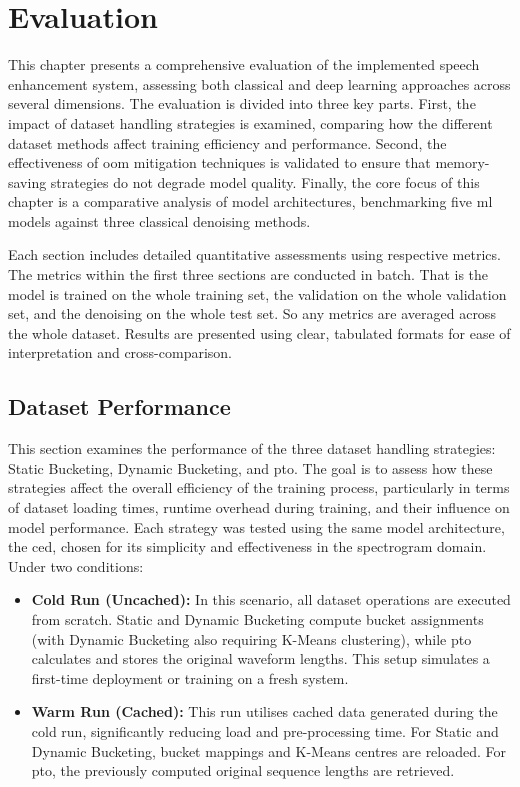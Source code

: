 \graphicspath{{content/chapters/7_evaluation/figures/}}
\chapter{Evaluation}
\label{chp:evaluation}

This chapter presents a comprehensive evaluation of the implemented speech enhancement system, assessing both classical and deep learning approaches across several dimensions. The evaluation is divided into three key parts. First, the impact of dataset handling strategies is examined, comparing how the different dataset methods affect training efficiency and performance. Second, the effectiveness of \gls{oom} mitigation techniques is validated to ensure that memory-saving strategies do not degrade model quality. Finally, the core focus of this chapter is a comparative analysis of model architectures, benchmarking five \gls{ml} models against three classical denoising methods.

Each section includes detailed quantitative assessments using respective metrics. The metrics within the first three sections are conducted in batch. That is the model is trained on the whole training set, the validation on the whole validation set, and the denoising on the whole test set. So any metrics are averaged across the whole dataset. Results are presented using clear, tabulated formats for ease of interpretation and cross-comparison.

\section{Dataset Performance}
\label{sec:dataset_performance}

This section examines the performance of the three dataset handling strategies: Static Bucketing, Dynamic Bucketing, and \gls{pto}. The goal is to assess how these strategies affect the overall efficiency of the training process, particularly in terms of dataset loading times, runtime overhead during training, and their influence on model performance. Each strategy was tested using the same model architecture, the \gls{ced}, chosen for its simplicity and effectiveness in the spectrogram domain. Under two conditions:

\begin{itemize}
    \item \textbf{Cold Run (Uncached):} In this scenario, all dataset operations are executed from scratch. Static and Dynamic Bucketing compute bucket assignments (with Dynamic Bucketing also requiring K-Means clustering), while \gls{pto} calculates and stores the original waveform lengths. This setup simulates a first-time deployment or training on a fresh system.
    
    \item \textbf{Warm Run (Cached):} This run utilises cached data generated during the cold run, significantly reducing load and pre-processing time. For Static and Dynamic Bucketing, bucket mappings and K-Means centres are reloaded. For \gls{pto}, the previously computed original sequence lengths are retrieved.
\end{itemize}


